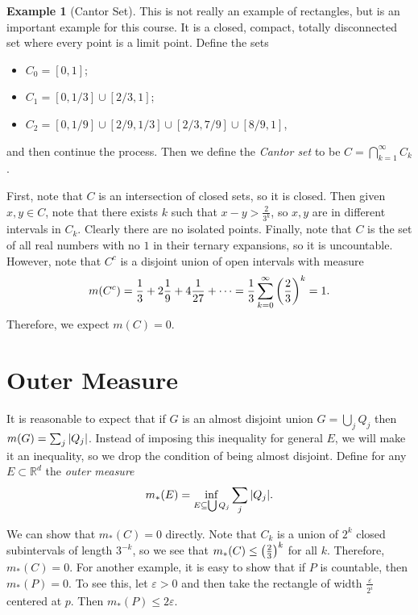 \documentclass[leqno, openany]{memoir}
\theoremstyle{definition}
\newtheorem{exm}[thm]{Example}
\theoremstyle{remark}
\theoremstyle{plain}
\theoremstyle{definition}
\theoremstyle{remark}
\newcommand{\R}{\mathbb{R}}
\newcommand{\ep}{\varepsilon}
\begin{document}
\begin{exm}[Cantor Set]
    This is not really an example of rectangles, but is an important example for this course. It is a closed, compact, totally disconnected set where every point is a limit point. Define the sets
    \begin{itemize}
        \item $C_0 = [0,1]$;
        \item $C_1 = [0,1/3] \cup [2/3,1]$;
        \item $C_2 = [0,1/9] \cup [2/9,1/3] \cup [2/3, 7/9] \cup [8/9,1]$,
    \end{itemize}
    and then continue the process. Then we define the \textit{Cantor set} to be $C = \bigcap_{k=1}^{\infty} C_k$.

    First, note that $C$ is an intersection of closed sets, so it is closed. Then given $x,y \in C$, note that there exists $k$ such that $x-y > \frac{2}{3^k}$, so $x,y$ are in different intervals in $C_k$. Clearly there are no isolated points. Finally, note that $C$ is the set of all real numbers with no $1$ in their ternary expansions, so it is uncountable. However, note that $C^c$ is a disjoint union of open intervals with measure
    \[ m(C^c) = \frac{1}{3} + 2 \frac{1}{9} + 4 \frac{1}{27} + \cdots = \frac{1}{3} \sum_{k=0}^{\infty} \qty(\frac{2}{3})^k = 1. \]
    Therefore, we expect $m(C) = 0$.
\end{exm}

\section{Outer Measure}%
\label{sec:outer_measure}

It is reasonable to expect that if $G$ is an almost disjoint union $G = \bigcup_j Q_j$ then $m(G) = \sum_j \abs{Q_j}$. Instead of imposing this inequality for general $E$, we will make it an inequality, so we drop the condition of being almost disjoint. Define for any $E \subset \R^d$ the \textit{outer measure}
\[ m_*(E) = \inf_{E \subseteq \bigcup Q_j} \sum_j \abs{Q_j}. \]

We can show that $m_*(C) = 0$ directly. Note that $C_k$ is a union of $2^k$ closed subintervals of length $3^{-k}$, so we see that $m_*(C) \leq \qty(\frac{2}{3})^k$ for all $k$. Therefore, $m_*(C) = 0$. For another example, it is easy to show that if $P$ is countable, then $m_*(P) = 0$. To see this, let $\ep > 0$ and then take the rectangle of width $\frac{\ep}{2^i}$ centered at $p$. Then $m_*(P) \leq 2 \ep$.
\end{document}
